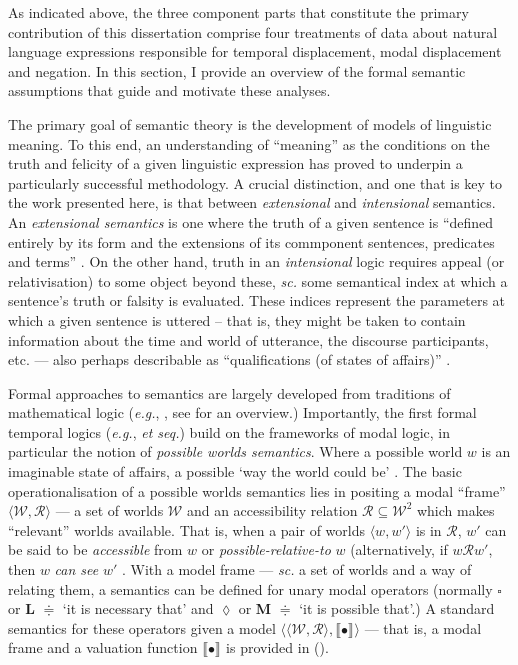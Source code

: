 \documentclass[11pt,dvipsnames]{report}
\providecommand{\denote}[2][]{\ensuremath{\llbracket{#2}\rrbracket^{#1}}}
\begin{document}
As indicated above, the three component parts that constitute the primary contribution of this dissertation comprise four treatments of data about natural language expressions responsible for temporal displacement, modal displacement and negation. In this section, I provide an overview of the formal semantic assumptions that guide and motivate these analyses.


The primary goal of semantic theory is the development of models of linguistic meaning. To this end, an understanding of ``meaning'' as the conditions on the truth and felicity of a given linguistic expression has proved to underpin a particularly successful methodology. A crucial distinction, and one that is key to the work presented here, is that between \textit{extensional} and \textit{intensional} semantics. An \textit{extensional semantics} is one where the truth of a given sentence is ``defined entirely by its form and the extensions of its commponent sentences, predicates and terms'' \citep{Menzel2017}. On the other hand, truth in an \textit{intensional} logic requires appeal (or relativisation) to some object beyond these, \textit{sc.} some semantical index at which a sentence's truth or falsity is evaluated. These indices represent the parameters at which a given sentence is uttered -- that is, they might be taken to contain information about the time and world of utterance, the discourse participants, etc. --- also perhaps describable as ``qualifications (of states of affairs)'' \citep{Nuyts2005}.

Formal approaches to semantics are largely developed from traditions of mathematical logic (\textit{e.g.}, \citealp{Montague1970}, see \citealp{Janssen2016} for an overview.) Importantly, the first formal temporal logics (\textit{e.g.}, \citealp{Prior1957} \textit{et seq.}) build on the frameworks of modal logic, in particular the notion of \textit{possible worlds semantics}. Where a possible world $ w $ is an imaginable state of affairs, a possible `way the world could be' \citep[\textit{e.g.},][]{Lewis1986}. The basic operationalisation of a possible worlds semantics lies in positing a modal ``frame'' $ \langle\mathcal{W,R}\rangle $ --- a set of worlds $ \mathcal W $ and an accessibility relation $ \mathcal{R\subseteq W}^2$ which makes ``relevant'' worlds available. That is, when a pair of worlds $\langle w,w' \rangle$ is in $ \mathcal R $, $ w' $ can be said to be \textit{accessible} from $ w $ or \textit{possible-relative-to} $ w $ (alternatively, if $ w\mathcal Rw' $, then $ w $ \textit{can see} $ w' $ \citep[37]{HC1996}. With a model frame --- \textit{sc.} a set of worlds and a way of relating them, a semantics can be defined for unary modal operators (normally $ \square $ or \textbf{L} $ \doteqdot $ `it is necessary that' and $ \lozenge $ or \textbf{M} $ \doteqdot $ `it is possible that'.) A standard semantics for these operators given a model $ \langle\mathcal{\langle W,R\rangle},\denote{•}\rangle $ --- that is, a modal frame and a valuation function \denote{•} is provided in (\nextx).
\end{document}
